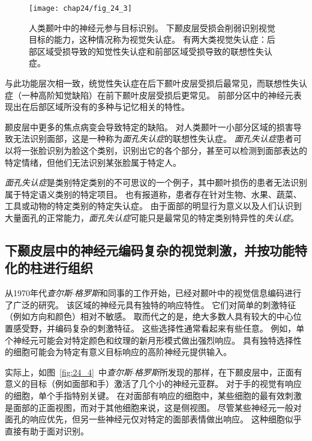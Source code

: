 \begin{figure}[htbp]
	\centering
	\texttt{[image: chap24/fig\_24\_3]}
	\caption{人类颞叶中的神经元参与目标识别。
		下颞皮层受损会削弱识别视觉目标的能力，这种情况称为视觉失认症。
		有两大类视觉失认症：后部区域受损导致的知觉性失认症和前部区域受损导致的联想性失认症。}
	\label{fig:24_3}
\end{figure}


与此功能层次相一致，统觉性失认症在后下颞叶皮层受损后最常见，而联想性失认症（一种高阶知觉缺陷）在前下颞叶皮层受损后更常见。
前部分区中的神经元表现出在后部区域所没有的多种与记忆相关的特性。


颞皮层中更多的焦点病变会导致特定的缺陷。
对人类颞叶一小部分区域的损害导致无法识别面部，这是一种称为\textit{面孔失认症}的联想性失认症。
\textit{面孔失认症}患者可以将一张脸识别为脸这个类别，识别出它的各个部分，甚至可以检测到面部表达的特定情绪，但他们无法识别某张脸属于特定人。


\textit{面孔失认症}是类别特定类别的不可思议的一个例子，其中颞叶损伤的患者无法识别属于特定语义类别的特定项目。
也有报道称，患者存在针对生物、水果、蔬菜、工具或动物的特定类别的特定失认症。
由于面部的明显行为意义以及人们认识到大量面孔的正常能力，\textit{面孔失认症}可能只是最常见的特定类别特异性的\textit{失认症}。



\subsection{下颞皮层中的神经元编码复杂的视觉刺激，并按功能特化的柱进行组织}

从1970年代\textit{查尔斯$\cdot$格罗斯}和同事的工作开始，已经对颞叶中的视觉信息编码进行了广泛的研究\cite{gross1999brain}。
该区域的神经元具有独特的响应特性。
它们对简单的刺激特征（例如方向和颜色）相对不敏感。 
取而代之的是，绝大多数人具有较大的中心位置感受野，并编码复杂的刺激特征。
这些选择性通常看起来有些任意。
例如，单个神经元可能会对特定颜色和纹理的新月形模式做出强烈响应。
具有独特选择性的细胞可能会为特定有意义目标响应的高阶神经元提供输入。


实际上，如图~\ref{fig:24_4}~中\textit{查尔斯$\cdot$格罗斯}所发现的那样，在下颞皮层中，正面有意义的目标（例如面部和手）激活了几个小的神经元亚群\cite{gross1969visual}。
对于手的视觉有响应的细胞，单个手指特别关键。
在对面部有响应的细胞中，某些细胞的最有效刺激是面部的正面视图，而对于其他细胞来说，这是侧视图。
尽管某些神经元一般对面孔的响应优先，但另一些神经元仅对特定的面部表情做出响应。
这种细胞似乎直接有助于面对识别。


